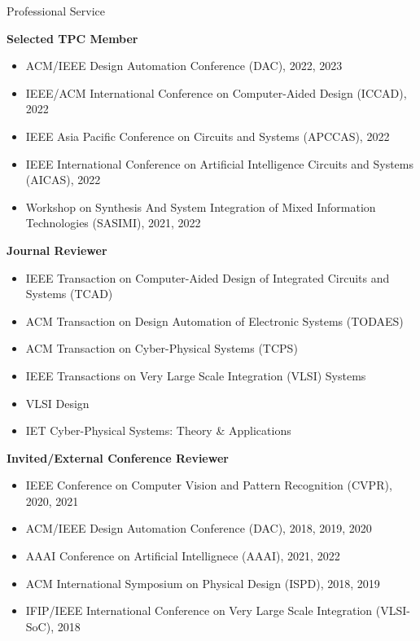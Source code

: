 
\begin{rSection}{Professional Service}

\textbf{Selected TPC Member}
\begin{itemize}
    \item ACM/IEEE Design Automation Conference (DAC), 2022, 2023
    \item IEEE/ACM International Conference on Computer-Aided Design (ICCAD), 2022
    \item IEEE Asia Pacific Conference on Circuits and Systems (APCCAS), 2022
    \item IEEE International Conference on Artificial Intelligence Circuits and Systems (AICAS), 2022
    \item Workshop on Synthesis And System Integration of Mixed Information Technologies (SASIMI), 2021, 2022
\end{itemize}


\textbf{Journal Reviewer}
\begin{itemize}
    \item IEEE Transaction on Computer-Aided Design of Integrated Circuits and Systems (TCAD)
    \item ACM Transaction on Design Automation of Electronic Systems (TODAES)
    \item ACM Transaction on Cyber-Physical Systems (TCPS)
    \item IEEE Transactions on Very Large Scale Integration (VLSI) Systems
    \item VLSI Design
    \item IET Cyber-Physical Systems: Theory \& Applications
\end{itemize}

\textbf{Invited/External Conference Reviewer}
\begin{itemize}
    \item IEEE Conference on Computer Vision and Pattern Recognition (CVPR), 2020, 2021
    \item ACM/IEEE Design Automation Conference (DAC), 2018, 2019, 2020
    \item AAAI Conference on Artificial Intellignece (AAAI), 2021, 2022
    \item ACM International Symposium on Physical Design (ISPD), 2018, 2019
    \item IFIP/IEEE International Conference on Very Large Scale Integration (VLSI-SoC), 2018
\end{itemize}
\end{rSection}

